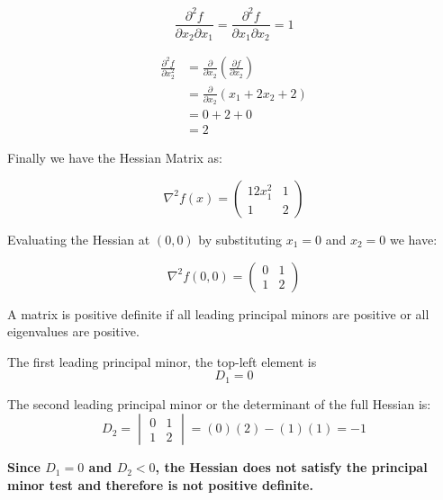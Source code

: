 \documentclass{article}
\begin{document}
\begin{equation}
\frac{\partial^2 f}{\partial x_2 \partial x_1} = \frac{\partial^2 f}{\partial x_1 \partial x_2} = 1
\end{equation}


\begin{align*}
\frac{\partial^2 f}{\partial x_2^2} &= \frac{\partial}{\partial x_2} \left( \frac{\partial f}{\partial x_2} \right) \\
&= \frac{\partial}{\partial x_2} (x_1 + 2x_2 + 2) \\
&= 0 + 2 + 0 \\
&= 2
\end{align*}

Finally we have the Hessian Matrix as:

\begin{equation}
\nabla^2 f(x) =
\begin{pmatrix}
12x_1^2 & 1 \\
1 & 2
\end{pmatrix}
\end{equation}


 Evaluating the Hessian at \( (0,0) \) by substituting \( x_1 = 0 \) and \( x_2 = 0 \) we have:

\begin{equation}
\nabla^2 f(0,0) =
\begin{pmatrix}
0 & 1 \\
1 & 2
\end{pmatrix}
\end{equation}


A matrix is positive definite if all leading principal minors are positive or  all eigenvalues are positive.

The first leading principal minor, the top-left element is
  \begin{equation}
  D_1 = 0
  \end{equation}

The second leading principal minor or the determinant of the full Hessian is:
  \begin{equation}
  D_2 = \begin{vmatrix} 0 & 1 \\ 1 & 2 \end{vmatrix} = (0)(2) - (1)(1) = -1
  \end{equation}

\textbf{Since \( D_1 = 0 \) and \( D_2 < 0 \), the Hessian does not satisfy the principal minor test and therefore is not positive definite. }
\end{document}
